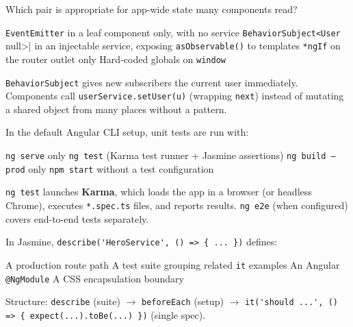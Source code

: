 \question[4]
Which pair is appropriate for app-wide state many components read?
\begin{choices}
  \choice \lstinline[style=tsinline]|EventEmitter| in a leaf component only, with no service
  \CorrectChoice \lstinline[style=tsinline]|BehaviorSubject<User | null>| in an injectable service, exposing \lstinline[style=tsinline]|asObservable()| to templates
  \choice \lstinline[style=htmlinline]|*ngIf| on the router outlet only
  \choice Hard-coded globals on \lstinline[style=tsinline]|window|
\end{choices}
\begin{solution}
  \lstinline[style=tsinline]|BehaviorSubject| gives new subscribers the current user immediately. Components call \lstinline[style=tsinline]|userService.setUser(u)| (wrapping \lstinline[style=tsinline]|next|) instead of mutating a shared object from many places without a pattern.
\end{solution}

\question[4]
In the default Angular CLI setup, unit tests are run with:
\begin{choices}
  \choice \texttt{ng serve} only
  \CorrectChoice \texttt{ng test} (Karma test runner + Jasmine assertions)
  \choice \texttt{ng build --prod} only
  \choice \texttt{npm start} without a test configuration
\end{choices}
\begin{solution}
  \texttt{ng test} launches \textbf{Karma}, which loads the app in a browser (or headless Chrome), executes \texttt{*.spec.ts} files, and reports results. \texttt{ng e2e} (when configured) covers end-to-end tests separately.
\end{solution}

\question[4]
In Jasmine, \lstinline[style=tsinline]|describe('HeroService', () => { ... })| defines:
\begin{choices}
  \choice A production route path
  \CorrectChoice A test suite grouping related \lstinline[style=tsinline]|it| examples
  \choice An Angular \lstinline[style=tsinline]|@NgModule|
  \choice A CSS encapsulation boundary
\end{choices}
\begin{solution}
  Structure: \lstinline[style=tsinline]|describe| (suite) $\rightarrow$ \lstinline[style=tsinline]|beforeEach| (setup) $\rightarrow$ \lstinline[style=tsinline]|it('should ...', () => { expect(...).toBe(...) })| (single spec).
\end{solution}

